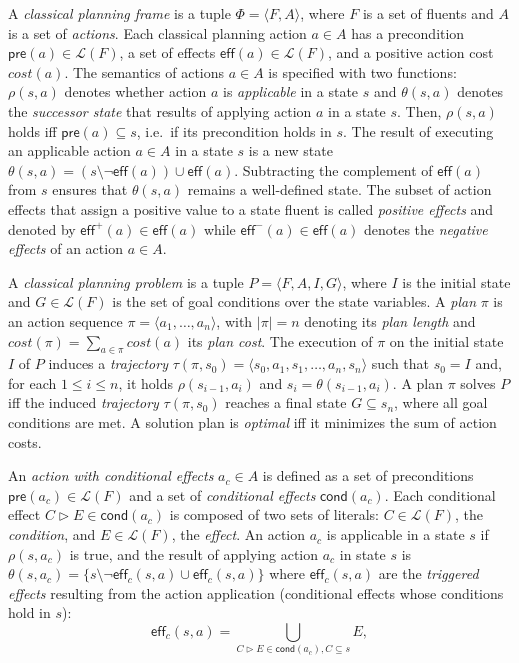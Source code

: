 \documentclass{article}
\newcommand{\tup}[1]{{\langle #1 \rangle}}
\newcommand{\pre}{\mathsf{pre}}     %
\newcommand{\eff}{\mathsf{eff}}     %
\newcommand{\cond}{\mathsf{cond}}   %
\begin{document}
A {\em classical planning frame} is a tuple $\Phi=\tup{F,A}$, where $F$ is a set of fluents and $A$ is a set of \emph{actions}. Each classical planning action $a\in A$ has a precondition $\pre(a)\in\mathcal{L}(F)$, a set of effects $\eff(a)\in\mathcal{L}(F)$, and a positive action cost $cost(a)$. The semantics of actions $a\in A$ is specified with two functions: $\rho(s,a)$ denotes whether action $a$ is {\em applicable} in a state $s$ and $\theta(s,a)$ denotes the {\em successor state} that results of applying action $a$ in a state $s$. Then, $\rho(s,a)$ holds iff $\pre(a)\subseteq s$, i.e.~if its precondition holds in $s$. The result of executing an applicable action $a\in A$ in a state $s$ is a new state $\theta(s,a)=(s\setminus \neg\eff(a))\cup\eff(a)$. Subtracting the complement of $\eff(a)$ from $s$ ensures that $\theta(s,a)$ remains a well-defined state. The subset of action effects that assign a positive value to a state fluent is called {\em positive effects} and denoted by $\eff^+(a)\in \eff(a)$ while $\eff^-(a)\in \eff(a)$ denotes the {\em negative effects} of an action $a\in A$.

A {\em classical planning problem} is a tuple $P=\tup{F,A,I,G}$, where $I$ is the initial state and $G\in\mathcal{L}(F)$ is the set of goal conditions over the state variables. A {\em plan} $\pi$ is an action sequence $\pi=\tup{a_1, \ldots, a_n}$, with $|\pi|=n$ denoting its {\em plan length} and $cost(\pi)=\sum_{a\in\pi} cost(a)$ its {\em plan cost}. The execution of $\pi$ on the initial state $I$ of $P$ induces a {\em trajectory} $\tau(\pi,s_0)=\tup{s_0, a_1, s_1, \ldots, a_n, s_n}$ such that $s_0=I$ and, for each {\small $1\leq i\leq n$}, it holds $\rho(s_{i-1},a_i)$ and $s_i=\theta(s_{i-1},a_i)$. A plan $\pi$ solves $P$ iff the induced {\em trajectory} $\tau(\pi,s_0)$ reaches a final state $G \subseteq s_n$, where all goal conditions are met. A solution plan is {\em optimal} iff it minimizes the sum of action costs.

An {\em action with conditional effects} $a_c\in A$ is defined as a set of preconditions $\pre(a_c)\in\mathcal{L}(F)$ and a set of {\em conditional effects} $\cond(a_c)$. Each conditional effect $C\rhd E\in\cond(a_c)$ is composed of two sets of literals: $C\in\mathcal{L}(F)$, the {\em condition}, and $E\in\mathcal{L}(F)$, the {\em effect}. An action $a_c$ is applicable in a state $s$ if $\rho(s,a_c)$ is true, and the result of applying action $a_c$ in state $s$ is $\theta(s,a_c)=\{s\setminus\neg\eff_c(s,a)\cup\eff_c(s,a)\}$ where $\eff_c(s,a)$ are the {\em triggered effects} resulting from the action application (conditional effects whose conditions hold in $s$):
\[
\eff_c(s,a)=\bigcup_{C\rhd E\in\cond(a_c),C\subseteq s} E,
\]
\end{document}

